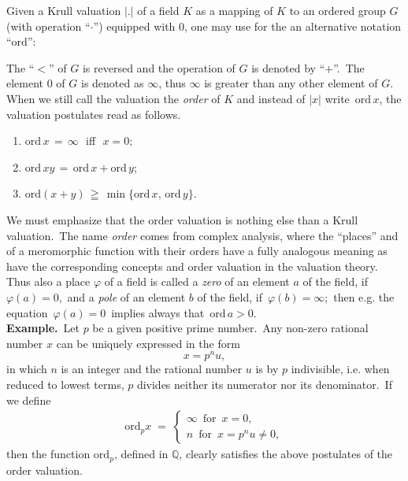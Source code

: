 \documentclass[12pt]{article}
\theoremstyle{definition}
\begin{document}
Given a Krull valuation $|.|$ of a field $K$ as a mapping of $K$ to an ordered group $G$ (with operation ``$\cdot$'') equipped with $0$, one may use for the  an alternative notation ``ord'':

The  ``$<$'' of $G$ is reversed and the operation of $G$ is denoted by ``$+$''.\,  The element $0$ of $G$ is denoted as $\infty$, thus $\infty$ is greater than any other element of $G$.\, When we still call the valuation the {\em order} of $K$ and instead of 
$|x|$ write\, $\mathrm{ord}\,x$, the valuation postulates read as follows.
\begin{enumerate}
\item $\mathrm{ord}\,x \,=\, \infty$\,\, iff\,\, $x = 0$;
\item $\mathrm{ord}\,xy \,=\, \mathrm{ord}\,x+\mathrm{ord}\,y$;
\item $\mathrm{ord}(x+y) \,\geqq\, \min\{\mathrm{ord}\,x,\,\mathrm{ord}\,y\}$.
\end{enumerate}

We must emphasize that the order valuation is nothing else than a Krull valuation.\, The name {\em order} comes from complex analysis, where the ``places''  and  of a meromorphic function with their orders have a fully analogous meaning as have the corresponding concepts  and order valuation in the valuation theory.\, Thus also a place $\varphi$ of a field is called a {\em zero} of an element $a$ of the field, if\, $\varphi(a) = 0$,\, and a {\em pole} of an element $b$ of the field, if\, $\varphi(b) = \infty$;\, then e.g. the equation\, $\varphi(a) = 0$\, implies always that\, $\mathrm{ord}\,a > 0$.\\

\textbf{Example.}\, Let $p$ be a given positive prime number.\, Any non-zero rational number $x$ can be uniquely expressed in the form
$$x = p^nu,$$
in which $n$ is an integer and the rational number $u$ is by $p$ indivisible, i.e. when reduced to lowest terms, $p$ divides neither its numerator nor its denominator.\, If we define
\begin{align*}
\mathrm{ord}_px \;=\; 
\begin{cases}
\infty\,\,\, \mathrm{for}\,\,\, x = 0,\\
 n\,\,\, \mathrm{for}\,\,\, x = p^nu \neq 0,
\end{cases}
\end{align*}
then the function $\mathrm{ord}_p$, defined in $\mathbb{Q}$, clearly satisfies the above postulates of the order valuation.
\end{document}

